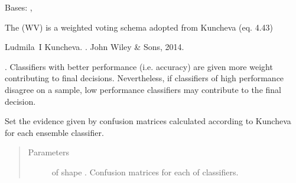 \documentclass[letterpaper,10pt,english]{sphinxmanual}
\begin{document}
\begin{fulllineitems}
\label{\detokenize{pusion.core.weighted_voting_combiner:pusion.core.weighted_voting_combiner.WeightedVotingCombiner}}
\sphinxAtStartPar
Bases: {\hyperref[\detokenize{pusion.core.combiner:pusion.core.combiner.EvidenceBasedCombiner}]{}}, {\hyperref[\detokenize{pusion.core.combiner:pusion.core.combiner.TrainableCombiner}]{}}

\sphinxAtStartPar
The {\hyperref[\detokenize{pusion.core.weighted_voting_combiner:pusion.core.weighted_voting_combiner.WeightedVotingCombiner}]{}} (WV) is a weighted voting schema adopted from Kuncheva (eq. 4.43)
%
\begin{footnote}[1]\sphinxAtStartFootnote
Ludmila I Kuncheva. . John Wiley \& Sons, 2014.
%
\end{footnote}. Classifiers with better performance (i.e. accuracy) are given more
weight contributing to final decisions. Nevertheless, if classifiers of high performance disagree on a sample,
low performance classifiers may contribute to the final decision.

\sphinxAtStartPar


\begin{fulllineitems}
\label{\detokenize{pusion.core.weighted_voting_combiner:pusion.core.weighted_voting_combiner.WeightedVotingCombiner.set_evidence}}
\sphinxAtStartPar
Set the evidence given by confusion matrices calculated according to Kuncheva \sphinxfootnotemark[1]
for each ensemble classifier.
\begin{quote}\begin{description}
\item[{Parameters}] \leavevmode
\sphinxAtStartPar
{} \textendash{}  of shape .
Confusion matrices for each of  classifiers.


\end{description}
\end{quote}
\end{fulllineitems}
\end{fulllineitems}
\end{document}
